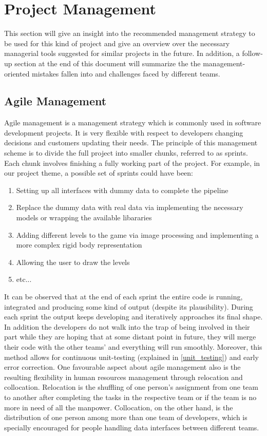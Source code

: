 \section{Project Management}
This section will give an insight into the recommended management strategy to be used for this kind of project and give an overview over the necessary managerial tools suggested for similar projects in the future.
In addition, a follow-up section at the end of this document will summarize the the management-oriented mistakes fallen into and challenges faced by different teams.

\subsection{Agile Management}
Agile management is a management strategy which is commonly used in software development projects. It is very flexible with respect to developers changing decisions and customers updating their needs. The principle of this management scheme is to divide the full project into smaller chunks, referred to as sprints. Each chunk involves finishing a fully working part of the project. For example, in our project theme, a possible set of sprints could have been:
\begin{enumerate}
  \item{Setting up all interfaces with dummy data to complete the pipeline}
  \item{Replace the dummy data with real data via implementing the necessary models or wrapping the available libararies}
  \item{Adding different levels to the game via image processing and implementing a more complex rigid body representation}
  \item{Allowing the user to draw the levels}
  \item{etc...}
\end{enumerate}
It can be observed that at the end of each sprint the entire code is running, integrated and producing some kind of output (despite its 	plausibility). During each sprint the output keeps developing and iteratively approaches its final shape. In addition the developers do not walk into the trap of being involved in their part while they are hoping that at some distant point in future, they will merge their code with the other teams' and everything will run smoothly. Moreover, this method allows for continuous unit-testing (explained in \autoref{unit_testing}) and early error correction.
One favourable aspect about agile management also is the resulting flexibility in human resources management through relocation and collocation. Relocation is the shuffling of one person's assignment from one team to another after completing the tasks in the respective team or if the team is no more in need of all the manpower. Collocation, on the other hand, is the distribution of one person among more than one team of developers, which is specially encouraged for people handling data interfaces between different teams.

